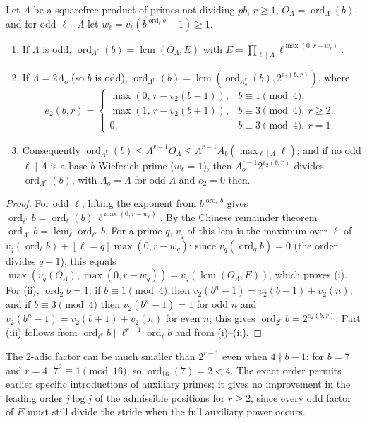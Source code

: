 \documentclass[11pt]{article}
\DeclareMathOperator{\ord}{ord}
\DeclareMathOperator{\lcm}{lcm}
\begin{document}
\begin{lemma}\label{lem:exactorder}
Let $\Lambda$ be a squarefree product of primes not dividing $pb$, $r\ge1$, $O_\Lambda=\ord_\Lambda(b)$, and for odd $\ell\mid\Lambda$
let $w_\ell=v_\ell(b^{\ord_\ell b}-1)\ge1$.
\begin{enumerate}[label=\textup{(\roman*)},nosep]
\item If $\Lambda$ is odd, $\ord_{\Lambda^r}(b)=\lcm(O_\Lambda,E)$ with $E=\prod_{\ell\mid\Lambda}\ell^{\max(0,r-w_\ell)}$.
\item If $\Lambda=2\Lambda_o$ (so $b$ is odd), $\ord_{\Lambda^r}(b)=\lcm(\ord_{\Lambda_o^r}(b),2^{e_2(b,r)})$, where
\[
e_2(b,r)=\begin{cases}\max(0,\,r-v_2(b-1)),& b\equiv1\pmod4,\\ \max(1,\,r-v_2(b+1)),& b\equiv3\pmod4,\ r\ge2,\\ 0,& b\equiv3\pmod4,\ r=1.\end{cases}
\]
\item Consequently $\ord_{\Lambda^r}(b)\le\Lambda^{r-1}O_\Lambda\le\Lambda^{r-1}A_b(\max_{\ell\mid\Lambda}\ell)$; and if no odd $\ell\mid\Lambda$ is a base-$b$
Wieferich prime ($w_\ell=1$), then $\Lambda_o^{r-1}2^{e_2(b,r)}$ divides $\ord_{\Lambda^r}(b)$, with $\Lambda_o=\Lambda$ for odd $\Lambda$ and
$e_2=0$ then.
\end{enumerate}
\end{lemma}

\begin{proof}
For odd $\ell$, lifting the exponent from $b^{\ord_\ell b}$ gives $\ord_{\ell^r}b=\ord_\ell(b)\,\ell^{\max(0,r-w_\ell)}$. By the Chinese
remainder theorem $\ord_{\Lambda^r}b=\lcm_\ell\ord_{\ell^r}b$. For a prime $q$, $v_q$ of this lcm is the maximum over $\ell$ of
$v_q(\ord_\ell b)+[\ell=q]\max(0,r-w_q)$; since $v_q(\ord_qb)=0$ (the order divides $q-1$), this equals
$\max(v_q(O_\Lambda),\max(0,r-w_q))=v_q(\lcm(O_\Lambda,E))$, which proves (i). For (ii), $\ord_2b=1$; if $b\equiv1\pmod4$ then
$v_2(b^n-1)=v_2(b-1)+v_2(n)$, and if $b\equiv3\pmod4$ then $v_2(b^n-1)=1$ for odd $n$ and $v_2(b^n-1)=v_2(b+1)+v_2(n)$ for even
$n$; this gives $\ord_{2^r}b=2^{e_2(b,r)}$. Part (iii) follows from $\ord_{\ell^r}b\mid\ell^{r-1}\ord_\ell b$ and from (i)--(ii).
\end{proof}

The $2$-adic factor can be much smaller than $2^{r-1}$ even when $4\nmid b-1$: for $b=7$ and $r=4$, $7^2\equiv1\pmod{16}$, so
$\ord_{16}(7)=2<4$. The exact order permits earlier specific introductions of auxiliary primes; it gives no
improvement in the leading order $j\log j$ of the admissible positions for $r\ge2$, since every odd factor of $E$ must
still divide the stride when the full auxiliary power occurs.
\end{document}
